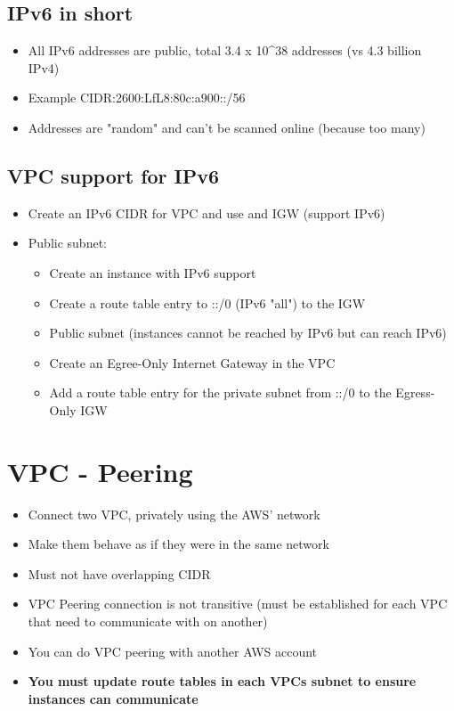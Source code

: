 \subsection{IPv6 in short}
\begin{itemize}
    \item All IPv6 addresses are public, total 3.4 x 10^38 addresses (vs 4.3 billion IPv4)
    \item Example CIDR:2600:LfL8:80c:a900::/56
    \item Addresses are "random" and can't be scanned online (because too many)
\end{itemize}

\subsection{VPC support for IPv6}
\begin{itemize}
    \item Create an IPv6 CIDR for VPC and use and IGW (support IPv6)
    \item Public subnet:
    \begin{itemize}
        \item Create an instance with IPv6 support
        \item Create a route table entry to ::/0 (IPv6 "all") to the IGW
        \item Public subnet (instances cannot be reached by IPv6 but can reach IPv6)
        \item Create an Egree-Only Internet Gateway in the VPC
        \item Add a route table entry for the private subnet from ::/0 to the Egress-Only IGW
    \end{itemize}
\end{itemize}


\section{VPC - Peering}
\begin{itemize}
    \item Connect two VPC, privately using the AWS' network
    \item Make them behave as if they were in the same network
    \item Must not have overlapping CIDR
    \item VPC Peering connection is not transitive (must be established for each VPC that need to communicate with on another)
    \item You can do VPC peering with another AWS account
    \item \textbf{You must update route tables in each VPCs subnet to ensure instances can communicate}
\end{itemize}


